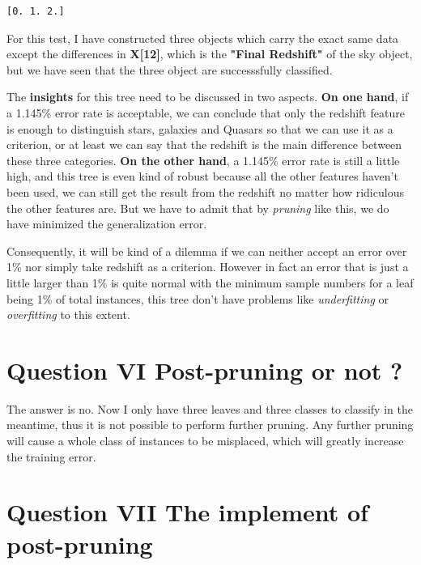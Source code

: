 \documentclass[11pt]{article}
\begin{document}
    \begin{Verbatim}[commandchars=\\\{\}]
[0. 1. 2.]

    \end{Verbatim}

    For this test, I have constructed three objects which carry the exact
same data except the differences in \textbf{X{[}12{]}}, which is the
\textbf{"Final Redshift"} of the sky object, but we have seen that the
three object are successsfully classified.

The \textbf{insights} for this tree need to be discussed in two aspects.
\textbf{On one hand}, if a 1.145\% error rate is acceptable, we can
conclude that only the redshift feature is enough to distinguish stars,
galaxies and Quasars so that we can use it as a criterion, or at least
we can say that the redshift is the main difference between these three
categories. \textbf{On the other hand}, a 1.145\% error rate is still a
little high, and this tree is even kind of robust because all the other
features haven't been used, we can still get the result from the
redshift no matter how ridiculous the other features are. But we have to
admit that by \emph{pruning} like this, we do have minimized the
generalization error.

Consequently, it will be kind of a dilemma if we can neither accept an
error over 1\% nor simply take redshift as a criterion. However in fact
an error that is just a little larger than 1\% is quite normal with the
minimum sample numbers for a leaf being 1\% of total instances, this
tree don't have problems like \emph{underfitting} or \emph{overfitting}
to this extent.

    \section{Question VI Post-pruning or not
?}\label{question-vi-post-pruning-or-not}

    The answer is no. Now I only have three leaves and three classes to
classify in the meantime, thus it is not possible to perform further
pruning. Any further pruning will cause a whole class of instances to be
misplaced, which will greatly increase the training error.

    \section{Question VII The implement of
post-pruning}\label{question-vii-the-implement-of-post-pruning}
\end{document}
